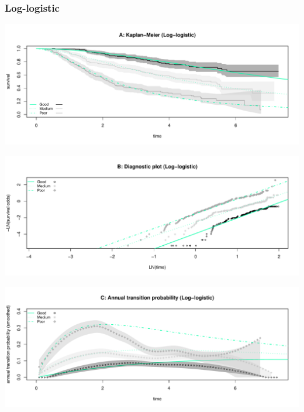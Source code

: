 \documentclass[
]{article}
\begin{document}
\clearpage

\subsubsection{Log-logistic}\label{log-logistic}

\begin{flushleft}\includegraphics[height=0.25\textheight]{BC_OS_output/Images/Figure_param_models-13} \end{flushleft}

\begin{flushleft}\includegraphics[height=0.25\textheight]{BC_OS_output/Images/Figure_param_models-14} \end{flushleft}

\begin{flushleft}\includegraphics[height=0.25\textheight]{BC_OS_output/Images/Figure_param_models-15} \end{flushleft}
\end{document}
